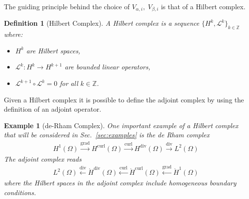 \documentclass[11pt,a4paper]{article}
\DeclareMathOperator*{\grad}{grad}
\renewcommand{\div}{\operatorname{div}}
\DeclareMathOperator*{\curl}{curl}
\newtheorem{example}{Example}
\newtheorem{definition}{Definition}
\begin{document}
The guiding principle behind the choice of $V_{\alpha, i}, \; V_{\beta, i}$ is that of a Hilbert complex. 
\begin{definition}[Hilbert Complex]
A \textit{Hilbert complex} is a sequence $\{H^k, \mathcal{L}^k\}_{k \in \mathbb{Z}}$ where:
\begin{itemize}
    \item $H^k$ are Hilbert spaces,
    \item $\mathcal{L}^k: H^k \to H^{k+1}$ are bounded linear operators,
    \item $\mathcal{L}^{k+1} \circ \mathcal{L}^k = 0$ for all $k \in \mathbb{Z}$.
\end{itemize}
\end{definition}
Given a Hilbert complex it is possible to define the adjoint complex by using the definition of an adjoint operator.

\begin{example}[de-Rham Complex]
    One important example of a Hilbert complex that will be considered in Sec.~\ref{sec:examples} is the de Rham complex
\begin{equation}
\begin{aligned}
H^1(\Omega) \xrightarrow{\grad} H^{\curl}(\Omega) \xrightarrow{\curl} H^{\div}(\Omega) \xrightarrow{\div} L^2(\Omega)
\end{aligned}
\end{equation}
The adjoint complex reads
\begin{equation}
\begin{aligned}
L^2(\Omega) \xleftarrow{\div} \mathring{H}^{\div}(\Omega) \xleftarrow{\curl} \mathring{H}^{\curl}(\Omega) \xleftarrow{\grad} \mathring{H}^1(\Omega)
\end{aligned}
\end{equation}
where the Hilbert spaces in the adjoint complex include homogeneous boundary conditions.   
\end{example}
 
\end{document}

